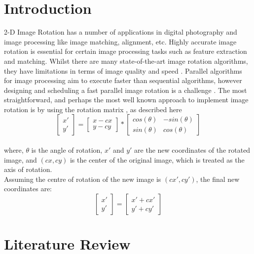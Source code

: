 \documentclass[conference]{IEEEtran}
\begin{document}
\section{Introduction}
2-D Image Rotation has a number of applications in digital photography and image processing like image matching, alignment, \cite{gaster2012heterogeneous} etc. Highly accurate image rotation is essential for certain image processing tasks such as feature extraction and matching. Whilst there are many state-of-the-art image rotation algorithms, they have limitations in terms of image quality and speed \cite{ashtari2015double} \cite{park2009accurate}.
Parallel algorithms for image processing aim to execute faster than sequential algorithms, however designing and scheduling a fast parallel image rotation is a challenge \cite{kwon2016study}.
The most straightforward, and perhaps the most well known approach to implement image rotation is by using the rotation matrix \cite{evans2001rotations}, as described here
$$\begin{bmatrix}
        x' \\
        y'
    \end{bmatrix} = \begin{bmatrix}
        x - cx \\
        y - cy
    \end{bmatrix} * \begin{bmatrix}
        cos(\theta) & -sin(\theta) \\
        sin(\theta) & cos(\theta)
    \end{bmatrix}$$\\
where, $\theta$ is the angle of rotation, $x'$ and $y'$ are the new coordinates of the rotated image, and $(cx, cy)$ is the center of the original image, which is treated as the axis of rotation.\\
Assuming the centre of rotation of the new image is $(cx', cy')$, the final new coordinates are:
$$\begin{bmatrix}
        x' \\
        y'
    \end{bmatrix} = \begin{bmatrix}
        x' + cx' \\
        y' + cy'
    \end{bmatrix}$$



\section{Literature Review}
\end{document}

